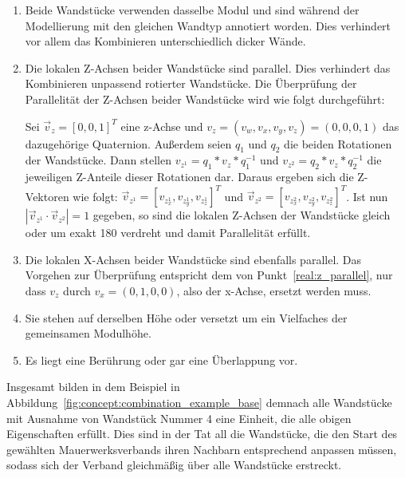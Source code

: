 \begin{enumerate}
    \item Beide Wandstücke verwenden dasselbe Modul und sind während der Modellierung mit den gleichen Wandtyp annotiert worden. 
    Dies verhindert vor allem das Kombinieren unterschiedlich dicker Wände.
    \item\label{real:z_parallel} Die lokalen Z-Achsen beider Wandstücke sind parallel. 
    Dies verhindert das Kombinieren unpassend rotierter Wandstücke.
    Die Überprüfung der Parallelität der Z-Achsen beider Wandstücke wird wie folgt durchgeführt:

    Sei \(\vec{v}_z = {[0, 0, 1]}^T\)
    eine z-Achse und \(v_z = (v_w, v_x, v_y, v_z) = (0, 0, 0, 1)\) das dazugehörige Quaternion. 
    Außerdem seien \(q_1\) und \(q_2\) die beiden Rotationen der Wandstücke. Dann stellen 
    \(v_{z^1} = q_1 * v_z * q_1^{-1}\) und 
    \(v_{z^2} = q_2 * v_z * q_2^{-1}\) die jeweiligen \glqq{}Z-Anteile\grqq{} dieser Rotationen dar.
    Daraus ergeben sich die \glqq{}Z-Vektoren\grqq{} wie folgt: 
    \(\vec{v}_{z^1} = {[v_{z^1_x}, v_{z^1_y}, v_{z^1_z}]}^T\) und
    \(\vec{v}_{z^2} = {[v_{z^2_x}, v_{z^2_y}, v_{z^2_z}]}^T\).
    Ist nun \(|\vec{v}_{z^1} \cdot \vec{v}_{z^2}| = 1\) gegeben, so sind die lokalen Z-Achsen der Wandstücke gleich oder um exakt 180\degree{} verdreht und damit Parallelität erfüllt.
    \item Die lokalen X-Achsen beider Wandstücke sind ebenfalls parallel. Das Vorgehen zur Überprüfung entspricht dem von Punkt~\ref{real:z_parallel}, nur dass \(v_z\) durch \(v_x = (0, 1, 0, 0)\), also der x-Achse, ersetzt werden muss.
    \item Sie stehen auf derselben Höhe oder versetzt um ein Vielfaches der gemeinsamen Modulhöhe.
    \item\label{concept:schichten} Es liegt eine Berührung oder gar eine Überlappung vor.
\end{enumerate}

Insgesamt bilden in dem Beispiel in Abbildung~\ref{fig:concept:combination_example_base} demnach alle Wandstücke mit Ausnahme von Wandstück Nummer 4 eine Einheit, die alle obigen Eigenschaften erfüllt.
Dies sind in der Tat all die Wandstücke, die den Start des gewählten Mauerwerksverbands ihren Nachbarn entsprechend anpassen müssen, sodass sich der Verband gleichmäßig über alle Wandstücke erstreckt.

